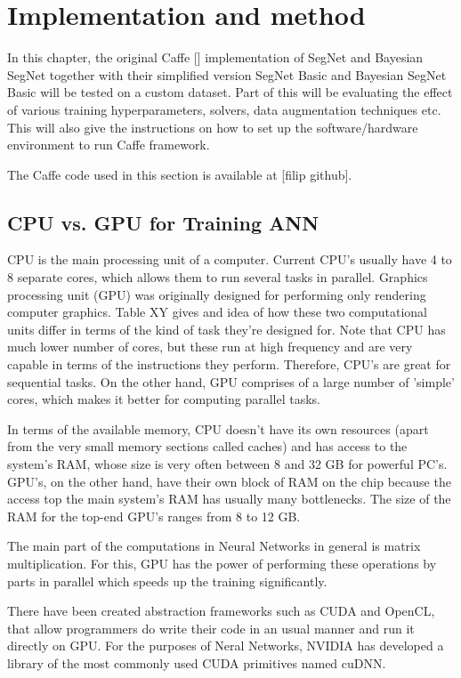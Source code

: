 \chapter{Implementation and method}

In this chapter, the original Caffe [] implementation of SegNet and Bayesian SegNet together with their simplified version SegNet Basic and Bayesian SegNet Basic will be tested on a custom dataset. Part of this will be evaluating the effect of various training hyperparameters, solvers, data augmentation techniques etc. This will also give the instructions on how to set up the software/hardware environment to run Caffe framework.

The Caffe code used in this section is available at [filip github].

\section{CPU vs. GPU for Training ANN}

CPU is the main processing unit of a computer. Current CPU's usually have 4 to 8 separate cores, which allows them to run several tasks in parallel. Graphics processing unit (GPU) was originally designed for performing only rendering computer graphics. Table XY gives and idea of how these two computational units differ in terms of the kind of task they're designed for. Note that CPU has much lower number of cores, but these run at high frequency and are very capable in terms of the instructions they perform. Therefore, CPU's are great for sequential tasks. On the other hand, GPU comprises of a large number of 'simple' cores, which makes it better for computing parallel tasks. 

In terms of the available memory, CPU doesn't have its own resources (apart from the very small memory sections called caches) and has access to the system's RAM, whose size is very often between 8 and 32 GB for powerful PC's. GPU's, on the other hand, have their own block of RAM on the chip because the access top the main system's RAM has usually many bottlenecks. The size of the RAM for the top-end GPU's ranges from 8 to 12 GB.

The main part of the computations in Neural Networks in general is matrix multiplication. For this, GPU has the power of performing these operations by parts in parallel which speeds up the training significantly. 

There have been created abstraction frameworks such as CUDA and OpenCL, that allow programmers do write their code in an usual manner and run it directly on GPU. For the purposes of Neral Networks, NVIDIA has developed a library of the most commonly used CUDA primitives named cuDNN. 

